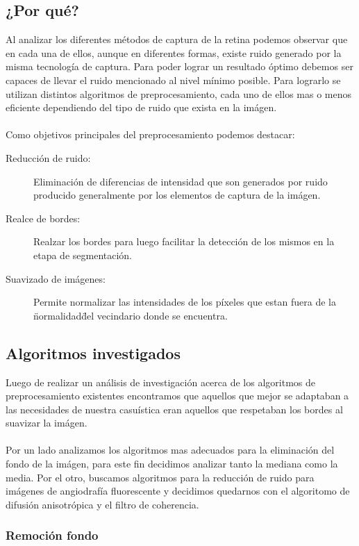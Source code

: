 \subsection{¿Por qu\'e?}
Al analizar los diferentes m\'etodos de captura de la retina podemos observar que en cada una de ellos, aunque en diferentes formas, existe ruido generado por la misma tecnolog\'ia de captura. Para poder lograr un resultado \'optimo debemos ser capaces de llevar el ruido mencionado al nivel m\'inimo posible. Para lograrlo se utilizan distintos algoritmos de preprocesamiento, cada uno de ellos mas o menos eficiente dependiendo del tipo de ruido que exista en la im\'agen.\\
\\
Como objetivos principales del preprocesamiento podemos destacar:
\begin{description}
  \item[Reducci\'on de ruido:] Eliminaci\'on de diferencias de intensidad que son generados por ruido producido generalmente por los elementos de captura de la im\'agen.
  \item[Realce de bordes:] Realzar los bordes para luego facilitar la detecci\'on de los mismos en la etapa de segmentaci\'on.
  \item[Suavizado de im\'agenes:] Permite normalizar las intensidades de los p\'ixeles que estan fuera de la \"normalidad\" del vecindario donde se encuentra.
\end{description}

\subsection{Algoritmos investigados}

Luego de realizar un an\'alisis de investigaci\'on acerca de los algoritmos de preprocesamiento existentes encontramos que aquellos que mejor se adaptaban a las necesidades de nuestra casu\'istica eran aquellos que respetaban los bordes al suavizar la im\'agen.\\
\\
Por un lado analizamos los algoritmos mas adecuados para la eliminaci\'on del fondo de la im\'agen, para este fin decidimos analizar tanto la mediana como la media. Por el otro, buscamos algoritmos para la reducci\'on de ruido para im\'agenes de angiodraf\'ia fluorescente y decidimos quedarnos con el algoritomo de difusi\'on anisotr\'opica y el filtro de coherencia.

\subsubsection{Remoci\'on fondo}

